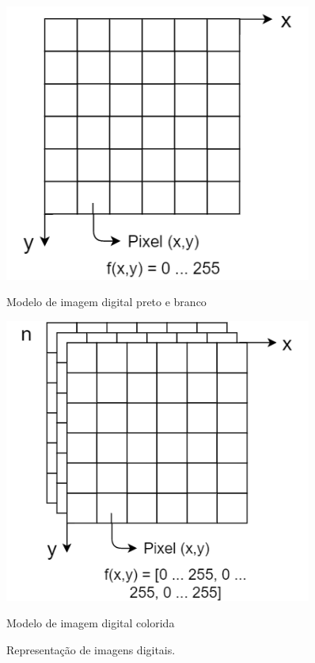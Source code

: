\documentclass[12pt]{report}
\begin{document}
\begin{figure}
  \centering
  \begin{minipage}[b]{0.45\textwidth}
    \includegraphics[width=0.9\textwidth]{images/imagembew.png}
    \caption{Modelo de imagem digital preto e branco}
  \end{minipage}
  \hfill
  \begin{minipage}[b]{0.45\textwidth}
    \includegraphics[width=0.9\textwidth]{images/imagemcolorida.png}
    \caption{Modelo de imagem digital colorida}
  \end{minipage}
  \caption{Representação de imagens digitais.}
  \label{fig:repre-imgs}
\end{figure}
\end{document}
